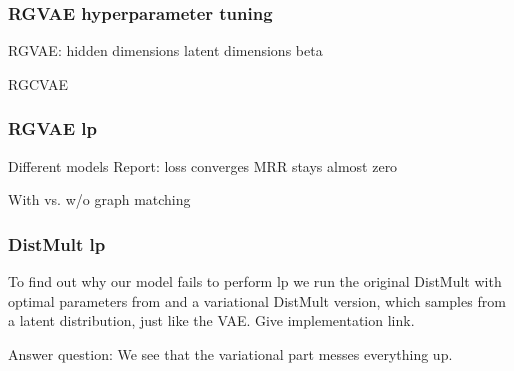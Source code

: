 
\subsubsection{RGVAE hyperparameter tuning}

RGVAE:
hidden dimensions
latent dimensions
beta


RGCVAE

\subsubsection{RGVAE lp}
Different models
Report:
loss converges
MRR stays almost zero

With vs. w/o graph matching


\subsubsection{DistMult lp}
To find out why our model fails to perform lp we run the original DistMult with optimal parameters from \cite{ruffinelli_you_2019} and a variational DistMult version, which samples from a latent distribution, just like the VAE. Give implementation link.

Answer question:
We see that the variational part messes everything up.

